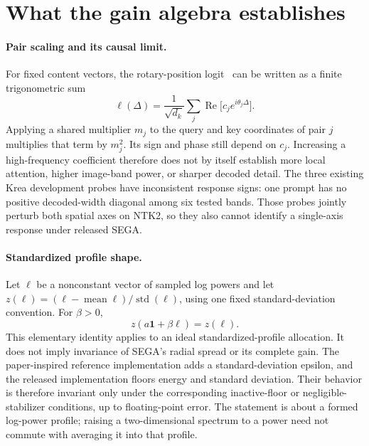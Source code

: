 \section{What the gain algebra establishes}
\label{sec:audited-algebra}

\paragraph{Pair scaling and its causal limit.}
For fixed content vectors, the rotary-position logit~\citep{su2024roformer}
can be written as a finite trigonometric sum
\begin{equation}
 \ell(\Delta)=\frac{1}{\sqrt{d_k}}
 \sum_j \operatorname{Re}\bigl[c_j e^{i\theta_j\Delta}\bigr].
\end{equation}
Applying a shared multiplier $m_j$ to the query and key coordinates of pair $j$
multiplies that term by $m_j^2$. Its sign and phase still depend on $c_j$.
Increasing a high-frequency coefficient therefore does not by itself establish
more local attention, higher image-band power, or sharper decoded detail.
The three existing Krea development probes have inconsistent response signs:
one prompt has no positive decoded-width diagonal among six tested bands.
Those probes jointly perturb both spatial axes on NTK2, so they also cannot
identify a single-axis response under released SEGA.

\paragraph{Standardized profile shape.}
Let $\ell$ be a nonconstant vector of sampled log powers and let
$z(\ell)=(\ell-\operatorname{mean}\ell)/\operatorname{std}(\ell)$,
using one fixed standard-deviation convention. For $\beta>0$,
\begin{equation}
 z(a\mathbf{1}+\beta\ell)=z(\ell).
\end{equation}
This elementary identity applies to an ideal standardized-profile allocation.
It does not imply invariance of SEGA's radial spread or its complete gain.
The paper-inspired reference implementation adds a standard-deviation epsilon,
and the released implementation floors energy and standard deviation. Their
behavior is therefore invariant only under the corresponding inactive-floor
or negligible-stabilizer conditions, up to floating-point error. The statement
is about a formed log-power profile; raising a two-dimensional spectrum to a
power need not commute with averaging it into that profile.

